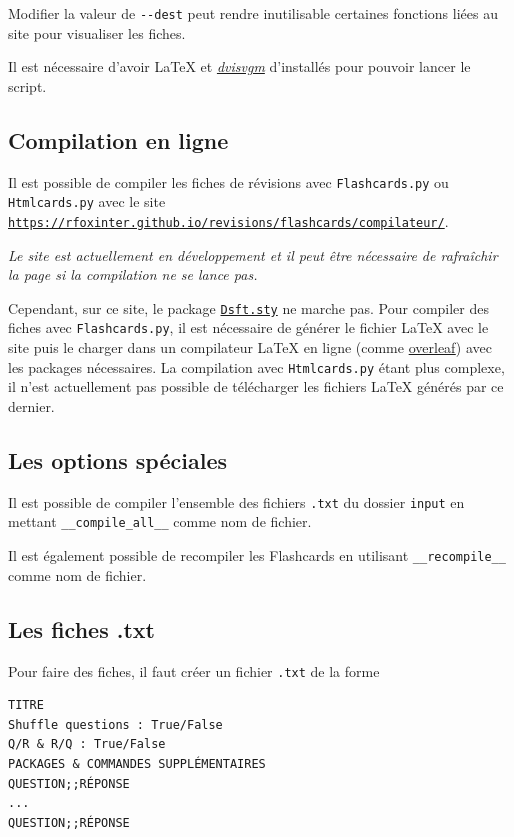 \documentclass[a4paper,12pt]{article}
\begin{document}
Modifier la valeur de \texttt{-{}-dest} peut rendre inutilisable certaines fonctions liées au site pour visualiser les fiches.

Il est nécessaire d'avoir \LaTeX{} et \href{https://ctan.org/pkg/dvisvgm/}{\color{black}\textsl{dvisvgm}} d'installés pour pouvoir lancer le script.

\subsection{Compilation en ligne}
Il est possible de compiler les fiches de révisions avec \texttt{Flashcards.py} ou \texttt{Htmlcards.py} avec le site \href{https://rfoxinter.github.io/revisions/flashcards/compilateur/}{\texttt{https://rfoxinter.github.io/revisions/flashcards/compilateur/}}.

\textsl{Le site est actuellement en développement et il peut être nécessaire de rafraîchir la page si la compilation ne se lance pas.}

Cependant, sur ce site, le package \hyperlink{section.8}{\texttt{Dsft.sty}} ne marche pas. Pour compiler des fiches avec \texttt{Flashcards.py}, il est nécessaire de générer le fichier \LaTeX{} avec le site puis le charger dans un compilateur \LaTeX{} en ligne (comme \href{https://www.overleaf.com/}{overleaf}) avec les packages nécessaires. La compilation avec \texttt{Htmlcards.py} étant plus complexe, il n'est actuellement pas possible de télécharger les fichiers \LaTeX{} générés par ce dernier.
\subsection{Les options spéciales}
Il est possible de compiler l'ensemble des fichiers \texttt{.txt} du dossier \texttt{input} en mettant \texttt{\_\_compile\_all\_\_} comme nom de fichier.

Il est également possible de recompiler les Flashcards en utilisant \texttt{\_\_recompile\_\_} comme nom de fichier.
\subsection{Les fiches .txt}
Pour faire des fiches, il faut créer un fichier \texttt{.txt} de la forme
\vspace{-\abovedisplayskip}\begin{verbatim}
TITRE
Shuffle questions : True/False
Q/R & R/Q : True/False
PACKAGES & COMMANDES SUPPLÉMENTAIRES
QUESTION;;RÉPONSE
...
QUESTION;;RÉPONSE
\end{verbatim}
\vspace{-\belowdisplayskip}
\end{document}
